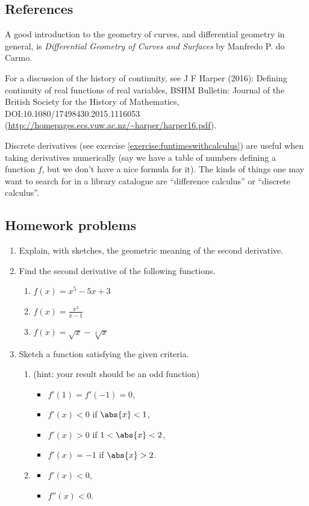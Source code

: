 \subsection{References}
A good introduction to the geometry of curves, and differential geometry in general, is \emph{Differential Geometry
of Curves and Surfaces} by Manfredo P. do Carmo.

For a discussion of the history of continuity, see J F Harper (2016): Defining continuity of
real functions of real variables, BSHM Bulletin: Journal of the British Society for the History
of Mathematics, DOI:10.1080/17498430.2015.1116053 (\url{http://homepages.ecs.vuw.ac.nz/~harper/harper16.pdf}).

Discrete derivatives (see exercise \ref{exercise:funtimeswithcalculus}) are useful when taking
derivatives numerically (say we have a table of numbers defining a function $ f $, but we don't
have a nice formula for it). The kinds of things one may want to search for in a library catalogue
are ``difference calculus'' or ``discrete calculus''.

\subsection{Homework problems}
\begin{enumerate}
  \item Explain, with sketches, the geometric meaning of the second derivative.
  \item Find the second derivative of the following functions.
    \begin{enumerate}
      \item $ f(x) = x^5 - 5x + 3 $
      \item $ f(x) = \frac{x^2}{x - 1} $
      \item $ f(x) = \sqrt{x} - \sqrt[4]{x} $
    \end{enumerate}
  \item Sketch a function satisfying the given criteria.
    \begin{enumerate}
      \item (hint: your result should be an odd function)
        \begin{itemize}
           \item $ f'(1) = f'(-1) = 0 $,
           \item $ f'(x) < 0 $ if $ \abs{x} < 1 $,
           \item $ f'(x) > 0 $ if $ 1 < \abs{x} < 2 $,
           \item $ f'(x) = -1 $ if $ \abs{x} > 2 $.
        \end{itemize}
      \item
        \begin{itemize}
          \item $ f'(x) < 0 $,
          \item $ f''(x) < 0 $.
        \end{itemize}
    \end{enumerate}
\end{enumerate}
